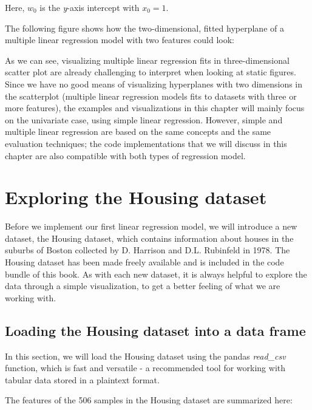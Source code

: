 \documentclass[11pt]{article}
\begin{document}
Here, \(w_0\) is the \emph{y}-axis intercept with \(x_0 = 1\).

The following figure shows how the two-dimensional, fitted hyperplane of
a multiple linear regression model with two features could look:

As we can see, visualizing multiple linear regression fits in
three-dimensional scatter plot are already challenging to interpret when
looking at static figures. Since we have no good means of visualizing
hyperplanes with two dimensions in the scatterplot (multiple linear
regression models fits to datasets with three or more features), the
examples and visualizations in this chapter will mainly focus on the
univariate case, using simple linear regression. However, simple and
multiple linear regression are based on the same concepts and the same
evaluation techniques; the code implementations that we will discuss in
this chapter are also compatible with both types of regression model.

    \section{Exploring the Housing
dataset}\label{exploring-the-housing-dataset}

    Before we implement our first linear regression model, we will introduce
a new dataset, the Housing dataset, which contains information about
houses in the suburbs of Boston collected by D. Harrison and D.L.
Rubinfeld in 1978. The Housing dataset has been made freely available
and is included in the code bundle of this book. As with each new
dataset, it is always helpful to explore the data through a simple
visualization, to get a better feeling of what we are working with.

    \subsection{Loading the Housing dataset into a data
frame}\label{loading-the-housing-dataset-into-a-data-frame}

    In this section, we will load the Housing dataset using the pandas
\emph{read\_csv} function, which is fast and versatile - a recommended
tool for working with tabular data stored in a plaintext format.

The features of the 506 samples in the Housing dataset are summarized
here:
\end{document}
